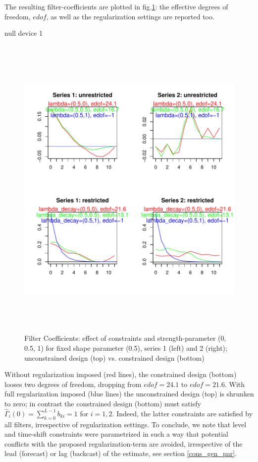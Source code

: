 \documentclass[a4paper]{book}
\begin{document}
The resulting filter-coefficients  are plotted in fig.\ref{z_mdfa_ms_reg_decay_screen_decay_2_rest}: the effective degrees of freedom, $edof$, as well as the regularization settings are reported too.
\begin{Schunk}
\begin{Soutput}
null device 
          1 
\end{Soutput}
\end{Schunk}
\begin{figure}[H]\begin{center}\includegraphics[height=6in, width=6in]{z_mdfa_ms_reg_decay_screen_decay_2_rest}\caption{Filter Coefficients: effect of constraints and strength-parameter (0, 0.5, 1) for fixed shape parameter (0.5), series 1 (left) and 2 (right); unconstrained design (top) vs. constrained design (bottom)\label{z_mdfa_ms_reg_decay_screen_decay_2_rest}}\end{center}\end{figure}Without regularization imposed (red lines), the constrained design (bottom) looses two degrees of freedom, dropping from $edof=24.1$ to $edof=21.6$. With full regularization imposed (blue lines) the unconstrained design (top) is shrunken to zero; in contrast the constrained design (bottom) must satisfy $\hat{\Gamma}_i(0)=\sum_{k=0}^{L-1}b_{ki}=1$ for $i=1,2$. Indeed, the latter constraints are satisfied by all filters, irrespective of regularization settings. To conclude, we note that level and time-shift constraints were parametrized in such a way that potential conflicts with the proposed regularization-term are avoided, irrespective of the lead (forecast) or lag (backcast) of the estimate, see section \ref{cons_gen_par}.
\end{document}
